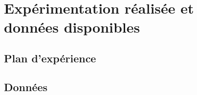 \chapter{Expérimentation réalisée et données disponibles} 


\section{Plan d'expérience}

\section{Données}
